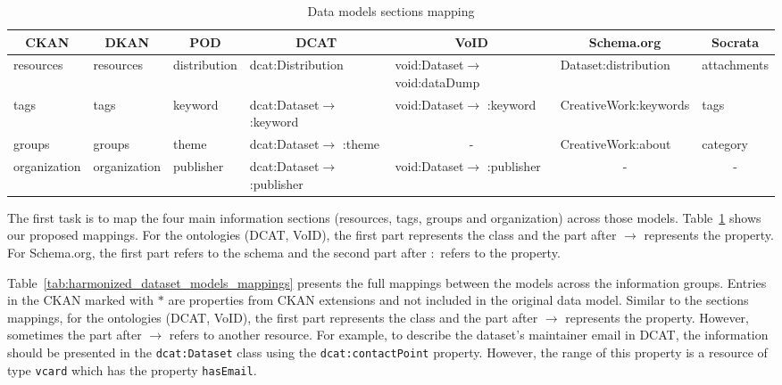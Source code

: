 \begin{table}[!htbp]
\centering
\tiny
\begin{tabular}{|l|l|l|l|l|l|l|}
\hline
\multicolumn{1}{|c|}{\textbf{CKAN}} & \multicolumn{1}{c|}{\textbf{DKAN}} & \multicolumn{1}{c|}{\textbf{POD}} & \multicolumn{1}{c|}{\textbf{DCAT}}     & \multicolumn{1}{c|}{\textbf{VoID}}     & \multicolumn{1}{c|}{\textbf{Schema.org}} & \multicolumn{1}{c|}{\textbf{Socrata}} \\ \hline
resources                           & resources                          & distribution                      & dcat:Distribution                      & void:Dataset$\rightarrow$ void:dataDump & Dataset:distribution                    & attachments                           \\ \hline
tags                                & tags                               & keyword                           & dcat:Dataset$\rightarrow$ :keyword   & void:Dataset$\rightarrow$ :keyword   & CreativeWork:keywords                     & tags                                  \\ \hline
groups                              & groups                             & theme                             & dcat:Dataset$\rightarrow$ :theme     &   \multicolumn{1}{c|}{-}                                      & CreativeWork:about                       & category                              \\ \hline
organization                        & organization                       & publisher                         & dcat:Dataset$\rightarrow$ :publisher &   void:Dataset$\rightarrow$ :publisher                                     & \multicolumn{1}{c|}{-}                   & \multicolumn{1}{c|}{-}                                      \\ \hline
\end{tabular}
\caption{Data models sections mapping}
\label{tab:models_section_mappings}
\end{table}

The first task is to map the four main information sections (resources, tags, groups and organization) across those models. Table~\ref{tab:models_section_mappings} shows our proposed mappings. For the ontologies (DCAT, VoID), the first part represents the class and the part after $\rightarrow$ represents the property. For Schema.org, the first part refers to the schema and the second part after $:$ refers to the property.

Table~\ref{tab:harmonized_dataset_models_mappings} presents the full mappings between the models across the information groups. Entries in the CKAN marked with $\ast$ are properties from CKAN extensions and not included in the original data model. Similar to the sections mappings, for the ontologies (DCAT, VoID), the first part represents the class and the part after $\rightarrow$ represents the property. However, sometimes the part after $\rightarrow$ refers to another resource. For example, to describe the dataset's maintainer email in DCAT, the information should be presented in the \texttt{dcat:Dataset} class using the \texttt{dcat:contactPoint} property. However, the range of this property is a resource of type \texttt{vcard} which has the property \texttt{hasEmail}.

